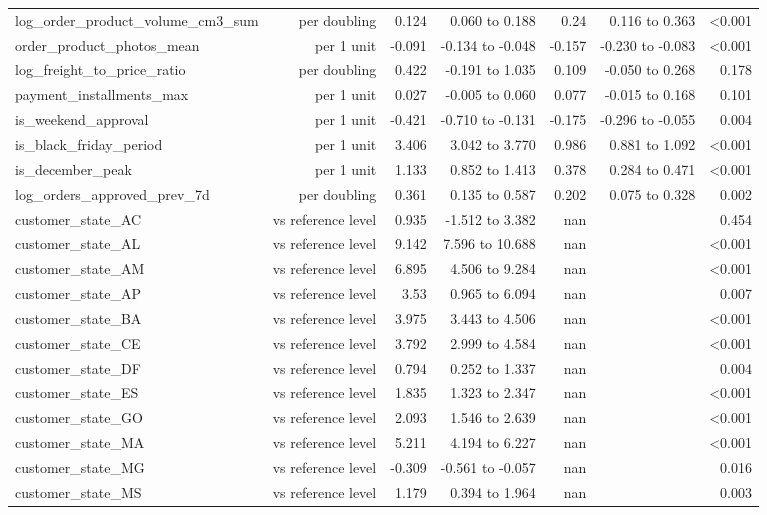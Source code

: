 \begin{table}[htbp]
\begin{tabular}{lrrrrrr}
log\_order\_product\_volume\_cm3\_sum & per doubling & 0.124 & 0.060 to 0.188 & 0.24 & 0.116 to 0.363 & <0.001 \\
order\_product\_photos\_mean & per 1 unit & -0.091 & -0.134 to -0.048 & -0.157 & -0.230 to -0.083 & <0.001 \\
log\_freight\_to\_price\_ratio & per doubling & 0.422 & -0.191 to 1.035 & 0.109 & -0.050 to 0.268 & 0.178 \\
payment\_installments\_max & per 1 unit & 0.027 & -0.005 to 0.060 & 0.077 & -0.015 to 0.168 & 0.101 \\
is\_weekend\_approval & per 1 unit & -0.421 & -0.710 to -0.131 & -0.175 & -0.296 to -0.055 & 0.004 \\
is\_black\_friday\_period & per 1 unit & 3.406 & 3.042 to 3.770 & 0.986 & 0.881 to 1.092 & <0.001 \\
is\_december\_peak & per 1 unit & 1.133 & 0.852 to 1.413 & 0.378 & 0.284 to 0.471 & <0.001 \\
log\_orders\_approved\_prev\_7d & per doubling & 0.361 & 0.135 to 0.587 & 0.202 & 0.075 to 0.328 & 0.002 \\
customer\_state\_AC & vs reference level & 0.935 & -1.512 to 3.382 & nan &  & 0.454 \\
customer\_state\_AL & vs reference level & 9.142 & 7.596 to 10.688 & nan &  & <0.001 \\
customer\_state\_AM & vs reference level & 6.895 & 4.506 to 9.284 & nan &  & <0.001 \\
customer\_state\_AP & vs reference level & 3.53 & 0.965 to 6.094 & nan &  & 0.007 \\
customer\_state\_BA & vs reference level & 3.975 & 3.443 to 4.506 & nan &  & <0.001 \\
customer\_state\_CE & vs reference level & 3.792 & 2.999 to 4.584 & nan &  & <0.001 \\
customer\_state\_DF & vs reference level & 0.794 & 0.252 to 1.337 & nan &  & 0.004 \\
customer\_state\_ES & vs reference level & 1.835 & 1.323 to 2.347 & nan &  & <0.001 \\
customer\_state\_GO & vs reference level & 2.093 & 1.546 to 2.639 & nan &  & <0.001 \\
customer\_state\_MA & vs reference level & 5.211 & 4.194 to 6.227 & nan &  & <0.001 \\
customer\_state\_MG & vs reference level & -0.309 & -0.561 to -0.057 & nan &  & 0.016 \\
customer\_state\_MS & vs reference level & 1.179 & 0.394 to 1.964 & nan &  & 0.003 \\

\end{tabular}
\end{table}
